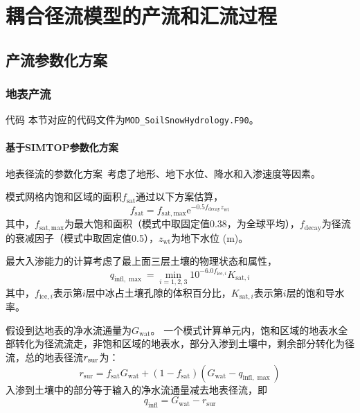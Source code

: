 \chapter{耦合径流模型的产流和汇流过程}

\section{产流参数化方案}

\subsection{地表产流}
\begin{mymdframed}{代码}
  本节对应的代码文件为\texttt{MOD\_SoilSnowHydrology.F90}。
\end{mymdframed}
\subsubsection{基于SIMTOP参数化方案}
地表径流的参数化方案~\citep{niu2005simple}考虑了地形、地下水位、降水和入渗速度等因素。

模式网格内饱和区域的面积$f_{\mathrm{sat}}$通过以下方案估算，
\begin{equation}
  f_{\mathrm{sat}}=f_{\mathrm{sat,max}}  \mathrm{e}^{-0.5  f_{\mathrm{decay}}  z_{\mathrm{wt}}}
\end{equation}
其中，$f_{\mathrm{sat,max}}$为最大饱和面积（模式中取固定值0.38，为全球平均），$f_{\mathrm{decay}}$为径流的衰减因子（模式中取固定值0.5），$z_{\mathrm{wt}}$为地下水位 (m)。

最大入渗能力的计算考虑了最上面三层土壤的物理状态和属性，
\begin{equation}
  q_{\mathrm{infl}, \max }= \min _{i=1,2,3} 10^{-6.0  f_{\mathrm{ice}, i}}  K_{\mathrm{sat}, i}
\end{equation}
其中，$f_{\mathrm{ice},i}$表示第$i$层中冰占土壤孔隙的体积百分比，$K_{\mathrm{sat},i}$表示第$i$层的饱和导水率。

假设到达地表的净水流通量为$G_{\mathrm{wat}}$。 一个模式计算单元内，饱和区域的地表水全部转化为径流流走，非饱和区域的地表水，部分入渗到土壤中，剩余部分转化为径流，总的地表径流$r_{\rm sur}$为：
\begin{equation}
  r_{\mathrm{sur}}=f_{\mathrm{sat}} G_{\mathrm{wat}}+\left(1-f_{\mathrm{sat}}\right)  \left(G_{\mathrm{wat}}-q_{\mathrm{infl},\max}\right)
\end{equation}
入渗到土壤中的部分等于输入的净水流通量减去地表径流，即
\begin{equation}
  q_{\mathrm{infl}}={G}_{\mathrm{wat}}-r_{\mathrm{sur}}
\end{equation}

